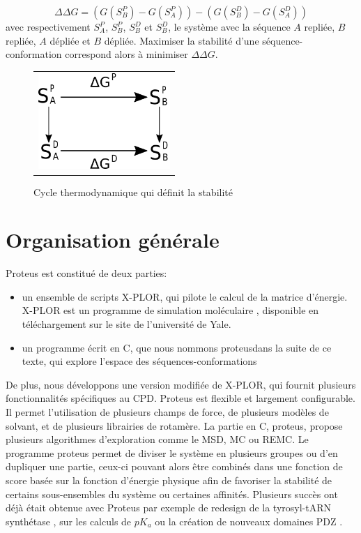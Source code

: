 \begin{equation}
  \label{deltaG}
\Delta \Delta G = (G(S^P_B)- G(S^P_A)) - (G(S^D_B)- G(S^D_A))
\end{equation}  
avec respectivement $S^P_A$, $S^P_B$, $S^D_B$ et $S^D_B$, le système avec la séquence $A$ repliée, $B$ repliée, $A$ dépliée et $B$ dépliée. Maximiser la stabilité d'une séquence-conformation correspond alors à minimiser $\Delta \Delta G$.

   \begin{figure}[!htbp]
     \centering
     \begin{tabular}{c}
       \includegraphics[width=5cm]{figure/cycleThermo.png}
     \end{tabular}
     
     \caption{Cycle thermodynamique qui définit la stabilité}
\label{fig:cycleThermo}
   \end{figure}


\section{Organisation générale}

Proteus est constitué de deux parties:
\begin{itemize}
\item un ensemble de scripts X-PLOR, qui pilote le calcul de la matrice d'énergie. X-PLOR est un programme de simulation moléculaire \cite{Xplor}, disponible en téléchargement sur le site de l'université de Yale.
\item un programme écrit en C, que nous nommons \og proteus\fg dans la suite de ce texte, qui explore l'espace des séquences-conformations
\end{itemize}
De plus, nous développons une version modifiée de X-PLOR, qui fournit plusieurs fonctionnalités spécifiques au CPD. Proteus est flexible et largement configurable. Il permet l'utilisation de plusieurs champs de force, de plusieurs modèles de solvant, et de plusieurs librairies de rotamère. La partie en C, proteus, propose plusieurs algorithmes d'exploration comme le MSD, MC ou REMC. Le programme proteus permet de diviser le système en plusieurs groupes ou d'en dupliquer une partie, ceux-ci pouvant alors être combinés dans une fonction de score basée sur la fonction d'énergie physique afin de favoriser la stabilité de certains sous-ensembles du système ou certaines affinités. Plusieurs succès ont déjà était obtenue avec Proteus par exemple de redesign de la tyrosyl-tARN synthétase \cite{Simonson16}, sur les calculs de $pK_a$ \cite{Villa17} ou la création de nouveaux domaines PDZ \cite{Mignon17}.


